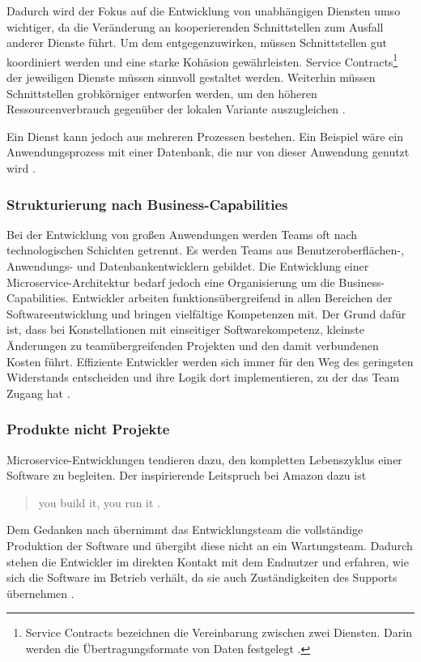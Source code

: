 Dadurch wird der Fokus auf die Entwicklung von unabhängigen Diensten umso wichtiger, da die Veränderung an kooperierenden Schnittstellen zum Ausfall anderer Dienste führt. 
Um dem entgegenzuwirken, müssen Schnittstellen gut koordiniert werden und eine starke Kohäsion gewährleisten. Service Contracts\footnote{Service Contracts bezeichnen die Vereinbarung zwischen zwei Diensten. Darin werden die Übertragungsformate von Daten festgelegt \cite{microservicesvssoa}.} der jeweiligen Dienste müssen sinnvoll gestaltet werden. 
Weiterhin müssen Schnittstellen grobkörniger entworfen werden, um den höheren Ressourcenverbrauch gegenüber der lokalen Variante auszugleichen \cite{FowlerMicroservice, BuildingMicroservicesNewman}. 

Ein Dienst kann jedoch aus mehreren Prozessen bestehen. Ein Beispiel wäre ein Anwendungsprozess mit einer Datenbank, die nur von dieser Anwendung genutzt wird \cite{FowlerMicroservice, BuildingMicroservicesNewman}.

\subsubsection{Strukturierung nach Business-Capabilities}
Bei der Entwicklung von großen Anwendungen werden Teams oft nach technologischen Schichten getrennt. 
Es werden Teams aus Benutzeroberflächen-, Anwendungs- und Datenbankentwicklern gebildet. 
Die Entwicklung einer Microservice-Architektur bedarf jedoch eine Organisierung um die Business-Capabilities. 
Entwickler arbeiten funktionsübergreifend in allen Bereichen der Softwareentwicklung und bringen vielfältige Kompetenzen mit.
Der Grund dafür ist, dass bei Konstellationen mit einseitiger Softwarekompetenz, kleinste Änderungen zu teamübergreifenden Projekten und den damit verbundenen Kosten führt.
Effiziente Entwickler werden sich immer für den Weg des geringsten Widerstands entscheiden und ihre Logik dort implementieren, zu der das Team Zugang hat \cite{FowlerMicroservice}.

\subsubsection{Produkte nicht Projekte}
Microservice-Entwicklungen tendieren dazu, den kompletten Lebenszyklus einer Software zu begleiten. 
Der inspirierende Leitspruch bei Amazon dazu ist \begin{quote}
  \glqq  you build it, you run it \grqq{} \cite{amazon}.\end{quote} 
Dem Gedanken nach übernimmt das Entwicklungsteam die vollständige Produktion der Software und übergibt diese nicht an ein Wartungsteam. 
Dadurch stehen die Entwickler im direkten Kontakt mit dem Endnutzer und erfahren, wie sich die Software im Betrieb verhält, da sie auch Zuständigkeiten des Supports übernehmen \cite{FowlerMicroservice}.

